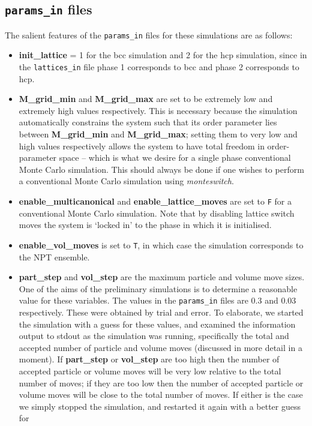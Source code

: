 \documentclass{report}
\begin{document}
\subsection{\texttt{params\_in} files}
The salient features of the \texttt{params\_in} files for these simulations are as follows:
\begin{itemize}
\item \textbf{init\_lattice} = 1 for the bcc simulation and 2 for the hcp simulation, since in the \texttt{lattices\_in} file phase 1 corresponds to
  bcc and phase 2 corresponds to hcp.
\item \textbf{M\_grid\_min} and \textbf{M\_grid\_max} are set to be extremely low and extremely high values respectively. This is necessary because
  the simulation automatically constrains the system such that its order parameter lies between \textbf{M\_grid\_min} and \textbf{M\_grid\_max};
  setting them to very low and high values respectively allows the system to have total freedom in order-parameter space --
  which is what we desire for a single phase conventional Monte Carlo simulation. This should always be done if one wishes
  to perform a conventional Monte Carlo simulation using \emph{monteswitch}.
\item \textbf{enable\_multicanonical} and \textbf{enable\_lattice\_moves} are set to \texttt{F} for a conventional Monte Carlo simulation. Note that by
  disabling lattice switch moves the system is `locked in' to the phase in which it is initialised.
\item \textbf{enable\_vol\_moves} is set to \texttt{T}, in which case the simulation corresponds to the NPT ensemble. 
\item \textbf{part\_step} and \textbf{vol\_step} are the maximum particle and volume move sizes. One of the aims of the preliminary simulations is
  to determine a reasonable value for these variables. The values in the \texttt{params\_in} files are 0.3 and 0.03 respectively. These
  were obtained by trial and error. To elaborate, we started the simulation with a guess for these values, and examined the 
  information output to stdout as the simulation was running, specifically the total and accepted number of particle and 
  volume moves (discussed in more detail in a moment). If \textbf{part\_step} or \textbf{vol\_step} are too high then the number of accepted particle 
  or volume moves will be very low relative to the total number of moves; if they are too low then the number of accepted particle or volume moves 
  will be close to the total number of moves. If either is the case we simply stopped the simulation, and restarted it again with a better guess for

\end{itemize}
\end{document}
